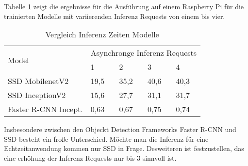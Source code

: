 Tabelle \ref{table:infertime} zeigt die ergebnisse für die 
Ausführung auf einem Raspberry Pi für die trainierten Modelle mit 
variierenden Inferenz Requests von einem bis vier.

\vspace{1cm}

\begin{table}[htb]
  \centering
  \label{table:infertime}
  \begin{tabular}{m{}|m{}<{\centering}|m{}<{\centering}|m{}<{\centering}|m{}<{\centering}}
  \hline
  \multirow{2}{*}{Model} & \multicolumn{4}{c}{Asynchronge Inferenz Requests} \\ \cline{2-5} 
                         & 1           & 2          & 3          & 4          \\ \hline\hline
  SSD MobilenetV2        & 19,5           & 35,2          & 40,6          & 40,3          \\
  SSD InceptionV2        & 15,6           & 27,7          & 31,1          & 31,7          \\
  Faster R-CNN Incept.   & 0,63           & 0,67          & 0,75          & 0,74          \\ \hline
  \end{tabular}
  \caption{Vergleich Inferenz Zeiten Modelle}
\end{table}

\vspace{1cm}

Insbesondere zwischen den Objeckt Detection Frameworks Faster R-CNN 
und SSD besteht ein froße Unterschied.
Möchte man die Inferenz für eine Echtzeitanwendung kommen nur SSD in Frage.
Desweiteren ist festzustellen, das eine erhöhung der Inferenz Requests 
nur bis 3 sinnvoll ist.


